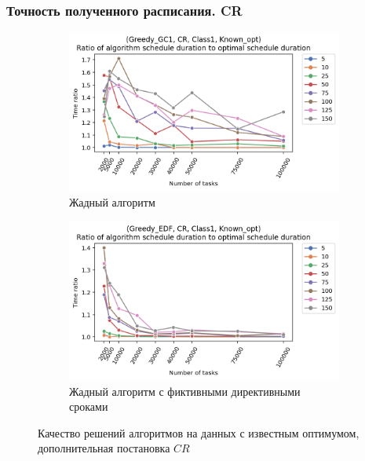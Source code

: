 \begin{frame}
    \frametitle{Точность полученного расписания. CR}
    \begin{figure}
        \begin{subfigure}{0.49\textwidth}
            \includegraphics[width=\textwidth]{imgs/ideal_1/CR/gr_amalgamated.png}
            \caption{Жадный алгоритм}
        \end{subfigure}
        \begin{subfigure}{0.49\textwidth}
            \includegraphics[width=\textwidth]{imgs/ideal_1/CR_EDF/gr_amalgamated.png}
            \caption{Жадный алгоритм с фиктивными директивными сроками}
        \end{subfigure}
        \caption{Качество решений алгоритмов на данных с известным оптимумом,\\ дополнительная постановка $CR$}
    \end{figure}
\end{frame}

